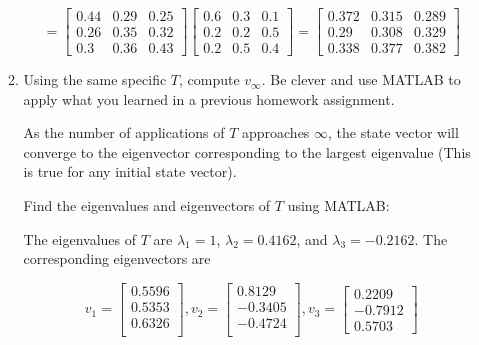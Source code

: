 \documentclass[fleqn]{article}
\begin{document}
\begin{enumerate}[nolistsep]
\begin{enumerate}
			\begin{equation*}
				= \begin{bmatrix}
					0.44 & 0.29 & 0.25\\
					0.26 & 0.35 & 0.32\\
					0.3  & 0.36 & 0.43
				\end{bmatrix}\begin{bmatrix}
					0.6 & 0.3 & 0.1\\
					0.2 & 0.2 & 0.5\\
					0.2 & 0.5 & 0.4
				\end{bmatrix} = \begin{bmatrix}
					0.372 & 0.315 & 0.289\\
					0.29  & 0.308 & 0.329\\
					0.338 & 0.377 & 0.382
				\end{bmatrix}
			\end{equation*}
			
			\item Using the same specific $T$, compute $v_{\infty}$. Be clever and use MATLAB to apply what you learned in a previous homework assignment.
			
			As the number of applications of $T$ approaches $\infty$, the state vector will converge to the eigenvector corresponding to the largest eigenvalue (This is true for any initial state vector).
			
			Find the eigenvalues and eigenvectors of $T$ using MATLAB:
			
			The eigenvalues of $T$ are $\lambda_1 = 1$, $\lambda_2 = 0.4162$, and $\lambda_3 = -0.2162$. The corresponding eigenvectors are
			
			\begin{equation*}
				v_1 = \begin{bmatrix}
					0.5596 \\
					0.5353 \\
					0.6326 \\
				\end{bmatrix}, 
				v_2 = \begin{bmatrix}
					0.8129 \\
					-0.3405 \\
					-0.4724 \\
				\end{bmatrix},
				v_3 = \begin{bmatrix}
					0.2209 \\
					-0.7912 \\
					0.5703
				\end{bmatrix}
			\end{equation*}
				

\end{enumerate}
\end{enumerate}
\end{document}
